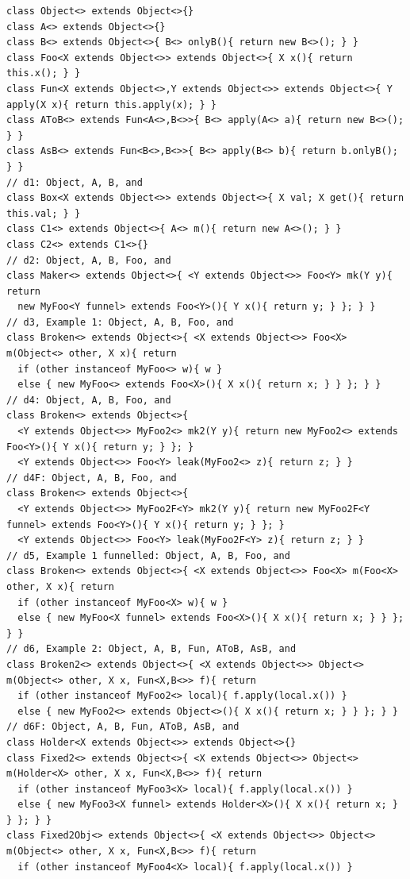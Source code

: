 \begin{lstlisting}
class Object<> extends Object<>{}
class A<> extends Object<>{}
class B<> extends Object<>{ B<> onlyB(){ return new B<>(); } }
class Foo<X extends Object<>> extends Object<>{ X x(){ return this.x(); } }
class Fun<X extends Object<>,Y extends Object<>> extends Object<>{ Y apply(X x){ return this.apply(x); } }
class AToB<> extends Fun<A<>,B<>>{ B<> apply(A<> a){ return new B<>(); } }
class AsB<> extends Fun<B<>,B<>>{ B<> apply(B<> b){ return b.onlyB(); } }
// d1: Object, A, B, and
class Box<X extends Object<>> extends Object<>{ X val; X get(){ return this.val; } }
class C1<> extends Object<>{ A<> m(){ return new A<>(); } }
class C2<> extends C1<>{}
// d2: Object, A, B, Foo, and
class Maker<> extends Object<>{ <Y extends Object<>> Foo<Y> mk(Y y){ return
  new MyFoo<Y funnel> extends Foo<Y>(){ Y x(){ return y; } }; } }
// d3, Example 1: Object, A, B, Foo, and
class Broken<> extends Object<>{ <X extends Object<>> Foo<X> m(Object<> other, X x){ return
  if (other instanceof MyFoo<> w){ w }
  else { new MyFoo<> extends Foo<X>(){ X x(){ return x; } } }; } }
// d4: Object, A, B, Foo, and
class Broken<> extends Object<>{
  <Y extends Object<>> MyFoo2<> mk2(Y y){ return new MyFoo2<> extends Foo<Y>(){ Y x(){ return y; } }; }
  <Y extends Object<>> Foo<Y> leak(MyFoo2<> z){ return z; } }
// d4F: Object, A, B, Foo, and
class Broken<> extends Object<>{
  <Y extends Object<>> MyFoo2F<Y> mk2(Y y){ return new MyFoo2F<Y funnel> extends Foo<Y>(){ Y x(){ return y; } }; }
  <Y extends Object<>> Foo<Y> leak(MyFoo2F<Y> z){ return z; } }
// d5, Example 1 funnelled: Object, A, B, Foo, and
class Broken<> extends Object<>{ <X extends Object<>> Foo<X> m(Foo<X> other, X x){ return
  if (other instanceof MyFoo<X> w){ w }
  else { new MyFoo<X funnel> extends Foo<X>(){ X x(){ return x; } } }; } }
// d6, Example 2: Object, A, B, Fun, AToB, AsB, and
class Broken2<> extends Object<>{ <X extends Object<>> Object<> m(Object<> other, X x, Fun<X,B<>> f){ return
  if (other instanceof MyFoo2<> local){ f.apply(local.x()) }
  else { new MyFoo2<> extends Object<>(){ X x(){ return x; } } }; } }
// d6F: Object, A, B, Fun, AToB, AsB, and
class Holder<X extends Object<>> extends Object<>{}
class Fixed2<> extends Object<>{ <X extends Object<>> Object<> m(Holder<X> other, X x, Fun<X,B<>> f){ return
  if (other instanceof MyFoo3<X> local){ f.apply(local.x()) }
  else { new MyFoo3<X funnel> extends Holder<X>(){ X x(){ return x; } } }; } }
class Fixed2Obj<> extends Object<>{ <X extends Object<>> Object<> m(Object<> other, X x, Fun<X,B<>> f){ return
  if (other instanceof MyFoo4<X> local){ f.apply(local.x()) }

\end{lstlisting}
